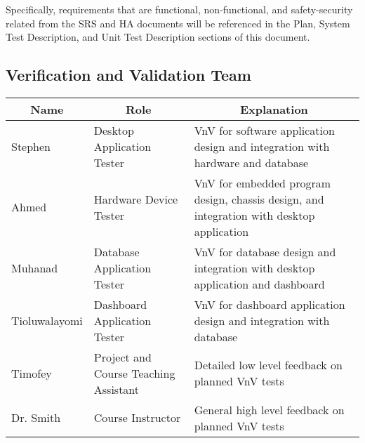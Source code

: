 \documentclass[12pt, titlepage]{article}
\begin{document}
  Specifically, requirements that are functional, non-functional, and safety-security related from the SRS and HA documents will be referenced in the Plan, System Test Description, and Unit Test Description sections of this document.\\

\subsection{Verification and Validation Team}


  \begin{table}[H]
    \centering
    \begin{tabular}{|p{3cm}|p{4cm}|p{7cm}|}
    \hline
    \multicolumn{1}{|c|}{\textbf{Name}} & \multicolumn{1}{|c|}{\textbf{Role}} & \multicolumn{1}{|c|}{\textbf{Explanation}}
    \\ \hline
    Stephen
    & Desktop Application Tester
    & VnV for software application design and integration with hardware and database
    \newline                                
    \\ \hline
  
    Ahmed                              
    & Hardware Device Tester
    & VnV for embedded program design, chassis design, and integration with desktop application
    \newline                                
    \\ \hline
  
    Muhanad                          
    & Database Application Tester
    & VnV for database design and integration with desktop application and dashboard
    \newline                                
    \\ \hline
  
    Tioluwalayomi                                
    & Dashboard Application Tester
    & VnV for dashboard application design and integration with database
    \newline                            
    \\ \hline

    Timofey                                
    & Project and Course Teaching Assistant
    & Detailed low level feedback on planned VnV tests
    \newline                            
    \\ \hline
  
    Dr. Smith                                
    & Course Instructor
    & General high level feedback on planned VnV tests 
    \newline                            
    \\ \hline
  
    \end{tabular}
  \end{table}
  \newpage
\end{document}
